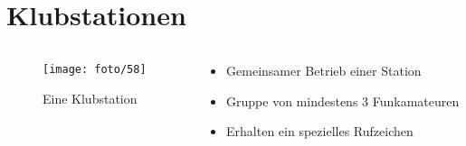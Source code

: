 
\section{Klubstationen}
\label{section:klubstationen}
\begin{frame}%

\begin{columns}
    \begin{column}{0.48\textwidth}
    
\begin{figure}
    \texttt{[image: foto/58]}
    \caption{\scriptsize Eine Klubstation}
    \label{n_klubstationen_klubstation}
\end{figure}

    \end{column}
   \begin{column}{0.48\textwidth}
       \begin{itemize}
  \item Gemeinsamer Betrieb einer Station
  \item Gruppe von mindestens 3 Funkamateuren
  \item Erhalten ein spezielles Rufzeichen
  \end{itemize}

   \end{column}
\end{columns}

\end{frame}

